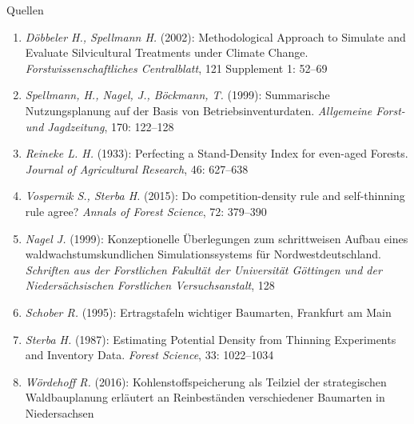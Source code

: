 \begin{frame}[plain]
\begin{center}
    \begin{minipage}{0.73\textwidth}  %
      \begin{block}{Quellen}
        \begin{tiny}
          \begin{enumerate}
          \item \emph{Döbbeler H., Spellmann H.} (2002): Methodological Approach to Simulate and Evaluate Silvicultural Treatments under Climate Change. \emph{Forstwissenschaftliches Centralblatt}, 121 Supplement 1: 52--69
          \item \emph{Spellmann, H., Nagel, J., Böckmann, T.} (1999): Summarische Nutzungsplanung auf der Basis von Betriebsinventurdaten. \emph{Allgemeine Forst- und Jagdzeitung}, 170: 122--128
          \item \emph{Reineke L. H.} (1933): Perfecting a Stand-Density Index for even-aged Forests. \emph{Journal of Agricultural Research}, 46: 627--638
          \item \emph{Vospernik S., Sterba H.} (2015): Do competition-density rule and self-thinning rule agree? \emph{Annals of Forest Science}, 72: 379--390
          \item \emph{Nagel J.} (1999): Konzeptionelle Überlegungen zum schrittweisen Aufbau eines waldwachstumskundlichen Simulationssystems für Nordwestdeutschland. \emph{Schriften aus der Forstlichen Fakultät der Universität Göttingen und der Niedersächsischen Forstlichen Versuchsanstalt}, 128
          \item \emph{Schober R.} (1995): Ertragstafeln wichtiger Baumarten, Frankfurt am Main
          \item \emph{Sterba H.} (1987): Estimating Potential Density from Thinning Experiments and Inventory Data. \emph{Forest Science}, 33: 1022--1034
          \item \emph{Wördehoff R.} (2016): Kohlenstoffspeicherung als Teilziel der strategischen Waldbauplanung erläutert an Reinbeständen verschiedener Baumarten in Niedersachsen
          \end{enumerate}
        \end{tiny}
      \end{block}
    \end{minipage}
  \end{center}
\end{frame}

